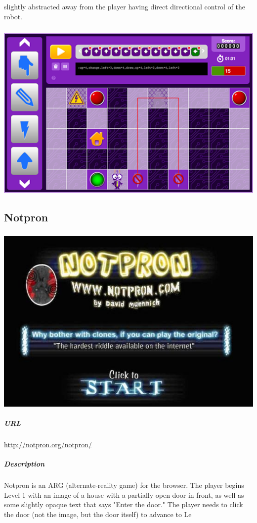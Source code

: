 slightly abstracted away from the player having direct directional control of the robot.\subparagraph{}\includegraphics[width = \textwidth]{img/botlogic_screen.png}\subsection{Notpron}\subparagraph{}\includegraphics[width = \textwidth]{img/notpron_title.jpeg}\subparagraph{URL}\url{http://notpron.org/notpron/}\subparagraph{Description}Notpron is an ARG (alternate-reality game) for the browser. The player begins Level 1 with an image of a house with a partially open door in front, as well as some slightly opaque text that says "Enter the door." The player needs to click the door (not the image, but the door itself) to advance to Le